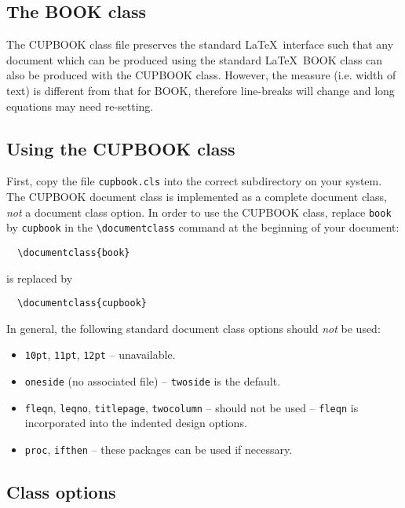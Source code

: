\documentclass[cup6a]{cupbook}
\begin{document}
\subsection{The BOOK class}

The CUPBOOK class file preserves the standard \LaTeX\ interface such
that any document which can be  produced using the standard \LaTeX\
BOOK class can also be produced with the CUPBOOK class.
 However, the measure (i.e. width of text) is different from that for
BOOK, therefore line-breaks will change and long equations may
need re-setting.

\subsection{Using the CUPBOOK class}

First, copy the file \verb"cupbook.cls" into the correct subdirectory
on your system.
The CUPBOOK document class is implemented as a complete docu\-ment
class, \emph{not} a document class option.
In order to use the CUPBOOK class, replace \verb"book" by
\verb"cupbook" in the \verb"\documentclass" command at the beginning
of your document:
 \begin{verbatim}
  \documentclass{book}
\end{verbatim}
 is replaced by
 \begin{verbatim}
  \documentclass{cupbook}
\end{verbatim}
 In general, the following standard document class options should \emph{not}
 be used:
 \begin{itemize}\listsize
  \item \texttt{10pt}, \texttt{11pt}, \texttt{12pt} -- unavailable.
  \item \texttt{oneside} (no associated file) -- \texttt{twoside} is the default.
  \item \texttt{fleqn}, \texttt{leqno}, \texttt{titlepage}, \texttt{twocolumn} --
        should not be used -- \texttt{fleqn} is incorporated into the indented
        design options.
  \item \texttt{proc}, \texttt{ifthen} -- these packages can be used if necessary.
 \end{itemize}

\subsection{Class options}
\end{document}
